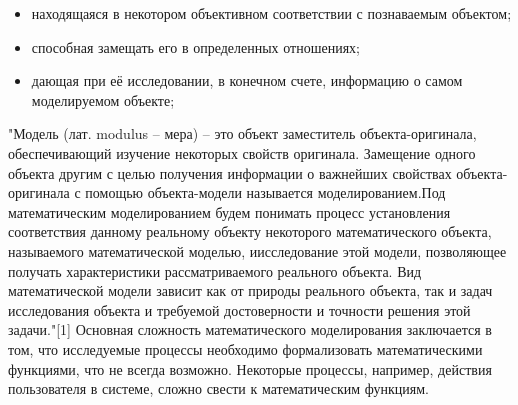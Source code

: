     \begin{itemize}
        \item находящаяся в некотором объективном соответствии с познаваемым объектом;
        \item способная замещать его в определенных отношениях;
        \item дающая при её исследовании, в конечном счете, информацию о самом моделируемом объекте;
    \end{itemize}

    "Модель (лат. modulus – мера) – это объект заместитель объекта-оригинала, обеспечивающий изучение некоторых свойств оригинала. Замещение одного объекта другим с целью получения информации о важнейших свойствах объекта-оригинала с помощью объекта-модели называется моделированием.Под математическим моделированием будем понимать процесс установления соответствия данному реальному объекту некоторого математического объекта, называемого математической моделью, иисследование этой модели, позволяющее получать характеристики рассматриваемого реального объекта. Вид математической модели зависит как от природы реального объекта, так и задач исследования объекта и требуемой достоверности и точности решения этой задачи."[1] Основная сложность математического моделирования заключается в том, что исследуемые процессы необходимо формализовать математическими функциями, что не всегда возможно. Некоторые процессы, например, действия пользователя в системе, сложно свести к математическим функциям.

